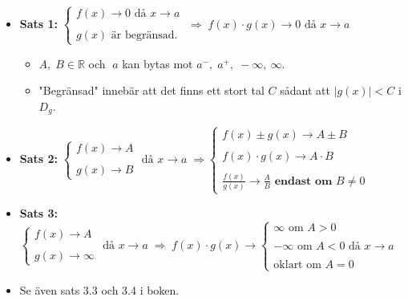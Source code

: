 \documentclass[swedish]{article}
\begin{document}
\begin{itemize} 
    \item{\textbf{Sats 1:} $\left\{ \begin{array}{l}
            f(x) \to 0 \text{ då } x \to a\\
            \\
            g(x) \text{ är begränsad.}
    \end{array} \right. \; \Rightarrow \; f(x) \cdot g(x) \to 0 \text{ då } x \to a$}
        \begin{itemize}    
            \item{$A, \; B\in \mathbb{R}$ och $\; a$ kan bytas mot $a^-, \; a^+, \; - \infty, \ \infty$.}
            \item{"Begränsad" innebär att det finns ett stort tal $C$ sådant att $|g(x)| < C$ i $D_g$.}
        \end{itemize}
    \item{\textbf{Sats 2:} $\left\{ \begin{array}{l}
            f(x) \to A\\
            \\
            g(x) \to B
    \end{array} \right. \text{ då } x \to a \; \Rightarrow \left\{ \begin{array}{l}
            f(x) \pm g(x) \to A \pm B\\
            \\
            f(x) \cdot g(x) \to A \cdot B\\
            \\
            \frac{f(x)}{g(x)} \to \frac{A}{B} \textbf{ endast om $B \neq 0$}
        \end{array} \right.$}
        \bigbreak
    \item{\textbf{Sats 3:} $\left\{ \begin{array}{l}
            f(x) \to A\\
            \\
            g(x) \to \infty
    \end{array} \right. \text{ då } x \to a \; \Rightarrow \; f(x) \cdot g(x) \to \left\{ \begin{array}{l}
        \infty \text{ om } A>0\\
        \\
        - \infty \text{ om } A<0 \text{ då } x \to a\\
        \\
        \text{oklart om } A = 0
    \end{array} \right.$}
\item{Se även sats 3.3 och 3.4 i boken.}

\end{itemize}
\end{document}
